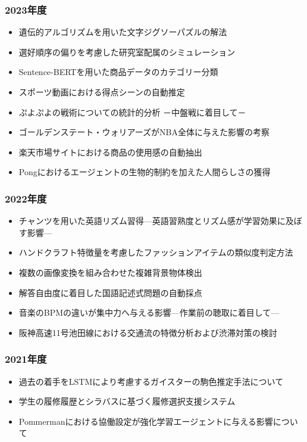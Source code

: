 \documentclass[paper=a4paper,fontsize=10.4pt]{jlreq}
\begin{document}
\begin{tcolorbox}[
colframe=gray, colback=white,
coltitle=white, colbacktitle=gray,
boxrule=0.8pt, arc=0mm,
outer arc=0mm,
sharp corners,
fonttitle=\bfseries,
enhanced,
attach boxed title to top left={xshift=5mm,yshift=-3mm},
boxed title style={frame hidden},
title=過去の卒業研究題目（過去4期分）
]
\begin{multicols}{2}
\fontsize{8bp}{11pt}\selectfont
\subsubsection*{2023年度}
\begin{itemize}[leftmargin=3mm]
  \item 遺伝的アルゴリズムを用いた文字ジグソーパズルの解法
  \item 選好順序の偏りを考慮した研究室配属のシミュレーション
  \item Sentence-BERTを用いた商品データのカテゴリー分類
  \item スポーツ動画における得点シーンの自動推定
  \item ぷよぷよの戦術についての統計的分析 －中盤戦に着目して－
  \item ゴールデンステート・ウォリアーズがNBA全体に与えた影響の考察
  \item 楽天市場サイトにおける商品の使用感の自動抽出
  \item Pongにおけるエージェントの生物的制約を加えた人間らしさの獲得
\end{itemize}
\subsubsection*{2022年度}
\begin{itemize}[leftmargin=3mm]
  \item チャンツを用いた英語リズム習得---英語習熟度とリズム感が学習効果に及ぼす影響---
  \item ハンドクラフト特徴量を考慮したファッションアイテムの類似度判定方法
  \item 複数の画像変換を組み合わせた複雑背景物体検出
  \item 解答自由度に着目した国語記述式問題の自動採点
  \item 音楽のBPMの違いが集中力へ与える影響---作業前の聴取に着目して---
  \item 阪神高速11号池田線における交通流の特徴分析および渋滞対策の検討
\end{itemize}
\subsubsection*{2021年度}
\begin{itemize}[leftmargin=3mm]
  \item 過去の着手をLSTMにより考慮するガイスターの駒色推定手法について
  \item 学生の履修履歴とシラバスに基づく履修選択支援システム
  \item Pommermanにおける協働設定が強化学習エージェントに与える影響について
\end{itemize}

\end{multicols}
\end{tcolorbox}
\end{document}

